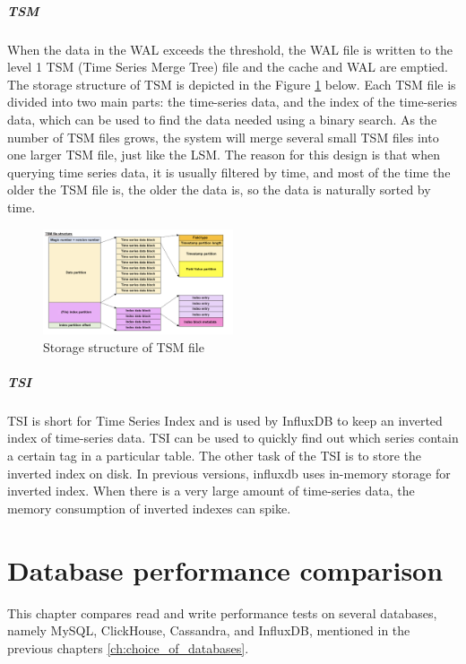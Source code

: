 \paragraph{TSM}
When the data in the WAL exceeds the threshold, the WAL file is written to the level 1 TSM (Time Series Merge Tree) file and the cache and WAL are emptied\cite{alibaba_influxdb}. The storage structure of TSM is depicted in the Figure \ref{fig:structure_tsm} below. Each TSM file is divided into two main parts: the time-series data, and the index of the time-series data, which can be used to find the data needed using a binary search. As the number of TSM files grows, the system will merge several small TSM files into one larger TSM file, just like the LSM. The reason for this design is that when querying time series data, it is usually filtered by time, and most of the time the older the TSM file is, the older the data is, so the data is naturally sorted by time.

\begin{figure}[hbt!]
	\centering
 	\includegraphics[width=0.5\textwidth]{gfx/TSM.png}
	\caption{Storage structure of TSM file\cite{alibaba_influxdb}}
	\label{fig:structure_tsm}
\end{figure}


\paragraph{TSI}
TSI is short for Time Series Index and is used by InfluxDB to keep an inverted index of time-series data. TSI can be used to quickly find out which series contain a certain tag in a particular table\cite{alibaba_influxdb}. The other task of the TSI is to store the inverted index on disk. In previous versions, influxdb uses in-memory storage for inverted index\cite{influxdb_cite}. When there is a very large amount of time-series data, the memory consumption of inverted indexes can spike.




\chapter{Database performance comparison}
\label{ch:database_performancecomparison}
This chapter compares read and write performance tests on several databases, namely MySQL, ClickHouse, Cassandra, and InfluxDB, mentioned in the previous chapters \ref{ch:choice_of_databases}.

